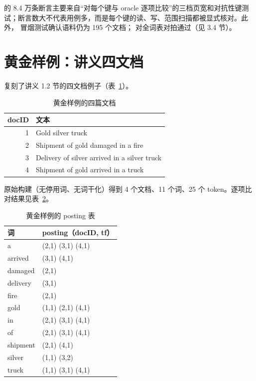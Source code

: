  的 8.4 万条断言主要来自“对每个键与  oracle 逐项比较”的三档页宽和对抗性键测试；断言数大不代表用例多，而是每个键的读、写、范围扫描都被显式核对。此外， 冒烟测试确认语料仍为 195 个文档； 对全词表对拍通过（见 3.4 节）。

\section{黄金样例：讲义四文档}

 复刻了讲义 1.2 节的四文档例子（表~\ref{tab:golden4-docs}）。

\begin{table}[H]
  \centering
  \caption{黄金样例的四篇文档}
  \label{tab:golden4-docs}
  \begin{tabularx}{\linewidth}{@{}r X@{}}
    \toprule
    docID & 文本 \\
    \midrule
    1 & Gold silver truck \\
    2 & Shipment of gold damaged in a fire \\
    3 & Delivery of silver arrived in a silver truck \\
    4 & Shipment of gold arrived in a truck \\
    \bottomrule
  \end{tabularx}
\end{table}

原始构建（无停用词、无词干化）得到 4 个文档、11 个词、25 个 token。逐项比对结果见表~\ref{tab:golden4-postings}。

\begin{table}[H]
  \centering
  \caption{黄金样例的 posting 表}
  \label{tab:golden4-postings}
  \begin{tabularx}{0.72\linewidth}{@{}l X@{}}
    \toprule
    词 & posting（docID, tf） \\
    \midrule
    a & (2,1) (3,1) (4,1) \\
    arrived & (3,1) (4,1) \\
    damaged & (2,1) \\
    delivery & (3,1) \\
    fire & (2,1) \\
    gold & (1,1) (2,1) (4,1) \\
    in & (2,1) (3,1) (4,1) \\
    of & (2,1) (3,1) (4,1) \\
    shipment & (2,1) (4,1) \\
    silver & (1,1) (3,2) \\
    truck & (1,1) (3,1) (4,1) \\
    \bottomrule
  \end{tabularx}
\end{table}

